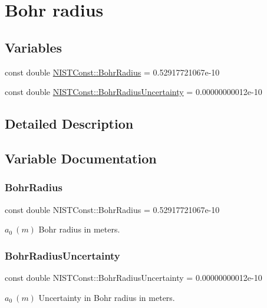 \hypertarget{group___bohr_radius}{}\section{Bohr radius}
\label{group___bohr_radius}
\subsection*{Variables}
\begin{DoxyCompactItemize}
\item 
const double \hyperlink{group___bohr_radius_ga38bdb86c2f3e484e8b164e75a3980638}{N\+I\+S\+T\+Const\+::\+Bohr\+Radius} = 0.\+52917721067e-\/10
\item 
const double \hyperlink{group___bohr_radius_gad031da8c7a2e239441e06c10fd8f6f07}{N\+I\+S\+T\+Const\+::\+Bohr\+Radius\+Uncertainty} = 0.\+00000000012e-\/10
\end{DoxyCompactItemize}


\subsection{Detailed Description}


\subsection{Variable Documentation}
\mbox{\label{group___bohr_radius_ga38bdb86c2f3e484e8b164e75a3980638}} 
\subsubsection{\texorpdfstring{Bohr\+Radius}{BohrRadius}}
{\footnotesize\ttfamily const double N\+I\+S\+T\+Const\+::\+Bohr\+Radius = 0.\+52917721067e-\/10}

$a_0 \ (m)$ Bohr radius in meters. \mbox{\label{group___bohr_radius_gad031da8c7a2e239441e06c10fd8f6f07}} 
\subsubsection{\texorpdfstring{Bohr\+Radius\+Uncertainty}{BohrRadiusUncertainty}}
{\footnotesize\ttfamily const double N\+I\+S\+T\+Const\+::\+Bohr\+Radius\+Uncertainty = 0.\+00000000012e-\/10}

$a_0 \ (m)$ Uncertainty in Bohr radius in meters. 
